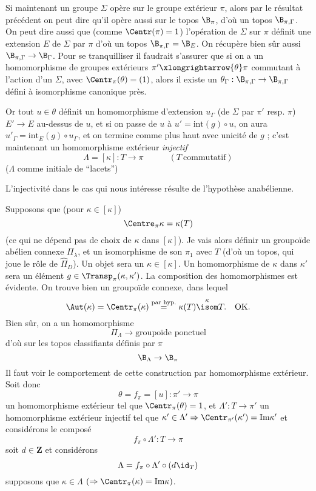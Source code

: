 Si maintenant un groupe $\Sigma$ opère sur le groupe extérieur $\pi$, alors par le résultat précédent on peut dire qu'il opère aussi sur le topos $\B_\pi$, d'où un topos $\B_{\pi, \Gamma}$. On peut dire aussi que (comme $\Centr (\pi) = 1$) l'opération de $\Sigma$ sur $\pi$ définit une extension $E$ de $\Sigma$ par $\pi$ d'où un topos $\B_{\pi, \Gamma} = \B_E$. On récupère bien sûr aussi $\B_{\pi, \Gamma} \to \B_\Gamma$. Pour se tranquilliser il faudrait s'assurer que si on a un homomorphisme de groupes extérieurs $\pi' \xlongrightarrow{\theta} \pi$ commutant à l'action d'un $\Sigma$, avec $\Centr_\pi (\theta) = (1)$, alors il existe un $\theta_\Gamma: \B_{\pi, \Gamma} \to \B_{\pi, \Gamma}$ défini à isomorphisme canonique près. 

Or tout $u \in \theta$ définit un homomorphisme d'extension $u_\Gamma$ (de $\Sigma$ par $\pi'$ resp. $\pi$) $E' \to E$ au-dessus de $u$, et si on passe de $u$ à $u' = \text{int}(g) \circ u$, on aura $u'_\Gamma = \text{int}_E (g) \circ u_\Gamma$, et on termine comme plus haut avec unicité de $g$ ; c'est maintenant un homomorphisme extérieur \emph{injectif}
$$
\Lambda = [ \kappa ]: T \to \pi \quad\quad\quad (T~\text{commutatif})
$$
($\Lambda$ comme initiale de ``lacets'')

L'injectivité dans le cas qui nous intéresse résulte de l'hypothèse anabélienne.

Supposons que (pour $\kappa \in [ \kappa ]$)
$$
\Centre_\pi \kappa = \kappa (T)
$$
(ce qui ne dépend pas de choix de $\kappa$ dans $[ \kappa ]$). Je vais alors définir un groupoïde abélien connexe $\Pi_\lambda$, et un isomorphisme de son $\pi_1$ avec $T$ (d'où un topos, qui joue le rôle de $\hat{\Pi}_D$). Un objet sera un $\kappa \in [ \kappa ]$. Un homomorphisme de $\kappa$ dans $\kappa'$ sera un élément $g \in \Transp_\pi (\kappa, \kappa')$. La composition des homomorphismes est évidente. On trouve bien un groupoïde connexe, dans lequel
$$
\Aut(\kappa) = \Centr_\pi (\kappa) \overset{\text{par hyp.}}{=} \kappa (T) \overset{\kappa}{\isom} T. \quad \text{OK.}
$$
Bien sûr, on a un homomorphisme
$$
\Pi_\Lambda \to \text{groupoïde ponctuel}
$$
d'où sur les topos classifiants définis par $\pi$
$$
\B_\Lambda \to \B_\pi
$$
Il faut voir le comportement de cette construction par homomorphisme extérieur. Soit donc
$$
\theta = f_\pi = [ u ]: \pi' \to \pi
$$
un homomorphisme extérieur tel que $\Centr_\pi (\theta) = 1$, et $\Lambda': T \to \pi'$ un homomorphisme extérieur injectif tel que $\kappa' \in \Lambda' \Rightarrow \Centr_{\pi'} (\kappa') = \text{Im} \kappa'$ et considérons le composé
$$
f_\pi \circ \Lambda': T \to \pi
$$
soit $d \in \mathbf{Z}$ et considérons
$$
\Lambda = f_\pi \circ \Lambda' \circ (d \id_T) 
$$
supposons que $\kappa \in \Lambda$ $(\Rightarrow \Centr_\pi (\kappa) = \text{Im} \kappa)$.

